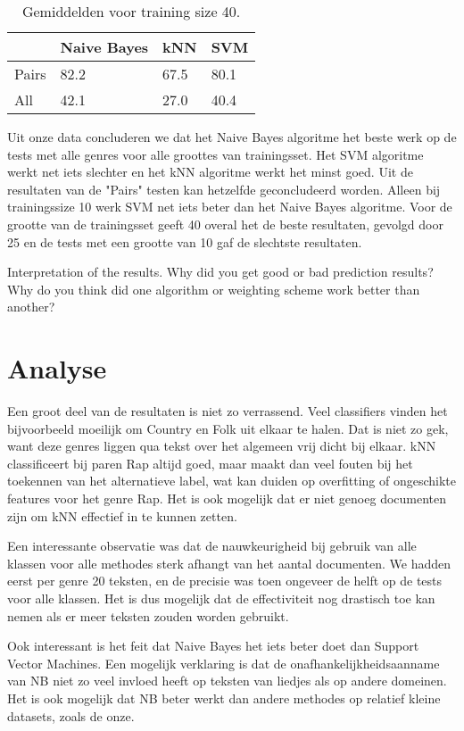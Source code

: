 \documentclass[a4paper,oneside]{article}
\begin{document}
\begin{table}[H]\centering
\caption{Gemiddelden voor training size 40.}
\begin{tabu}{l|l|l|l}
& Naive Bayes & kNN & SVM \\ \hline
Pairs & 82.2 & 67.5 & 80.1 \\
All & 42.1 & 27.0 & 40.4 \\
\end{tabu}
\end{table}

Uit onze data concluderen we dat het Naive Bayes algoritme het beste werk op de tests met alle genres voor alle groottes van trainingsset. Het SVM algoritme werkt net iets slechter en het kNN algoritme werkt het minst goed. Uit de resultaten van de "Pairs" testen kan hetzelfde geconcludeerd worden. Alleen bij trainingssize 10 werk SVM net iets beter dan het Naive Bayes algoritme. Voor de grootte van de trainingsset geeft 40 overal het de beste  resultaten, gevolgd door 25 en de tests met een grootte van 10 gaf de slechtste resultaten. 

Interpretation of the results. Why did you get good or bad prediction results? Why do you think did one algorithm or weighting scheme work better than another?

\section{Analyse}
Een groot deel van de resultaten is niet zo verrassend. Veel classifiers vinden het bijvoorbeeld moeilijk om Country en Folk uit elkaar te halen. Dat is niet zo gek, want deze genres liggen qua tekst over het algemeen vrij dicht bij elkaar. kNN classificeert bij paren Rap altijd goed, maar maakt dan veel fouten bij het toekennen van het alternatieve label, wat kan duiden op overfitting of ongeschikte features voor het genre Rap. Het is ook mogelijk dat er niet genoeg documenten zijn om kNN effectief in te kunnen zetten.

Een interessante observatie was dat de nauwkeurigheid bij gebruik van alle klassen voor alle methodes sterk afhangt van het aantal documenten. We hadden eerst per genre 20 teksten, en de precisie was toen ongeveer de helft op de tests voor alle klassen. Het is dus mogelijk dat de effectiviteit nog drastisch toe kan nemen als er meer teksten zouden worden gebruikt.

Ook interessant is het feit dat Naive Bayes het iets beter doet dan Support Vector Machines. Een mogelijk verklaring is dat de onafhankelijkheidsaanname van NB niet zo veel invloed heeft op teksten van liedjes als op andere domeinen. Het is ook mogelijk dat NB beter werkt dan andere methodes op relatief kleine datasets, zoals de onze.
\end{document}
